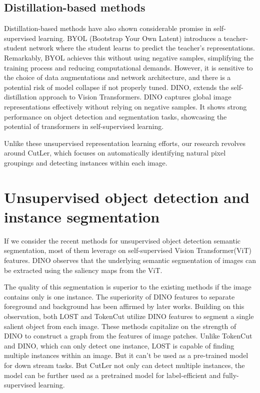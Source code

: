 \subsection{Distillation-based methods}
Distillation-based methods have also shown considerable promise in self-supervised learning. BYOL (Bootstrap Your Own Latent)\cite{grill2020bootstrap} introduces a teacher-student network where the student learns to predict the teacher's representations. Remarkably, BYOL achieves this without using negative samples, simplifying the training process and reducing computational demands. However, it is sensitive to the choice of data augmentations and network architecture, and there is a potential risk of model collapse if not properly tuned. DINO\cite{caron2021emerging}, extends the self-distillation approach to Vision Transformers\cite{dosovitskiy2020image}. DINO captures global image representations effectively without relying on negative samples. It shows strong performance on object detection and segmentation tasks, showcasing the potential of transformers in self-supervised learning.

Unlike these unsupervised representation learning efforts, our research revolves around CutLer\cite{wang2023cut}, which focuses on automatically identifying natural pixel groupings and detecting instances within each image.

\section{Unsupervised object detection and instance segmentation}
If we consider the recent methods for unsupervised object detection semantic segmentation, most of them leverage on self-supervised Vision Transformer(ViT)\cite{dosovitskiy2020image} features. DINO\cite{caron2021emerging} observes that the underlying semantic segmentation of images can be extracted using the saliency maps from the ViT. 

The quality of this segmentation is superior to the existing methods if the image contains only is one instance. The superiority of DINO features to separate foreground and background has been affirmed by later works\cite{engstler2023understanding}. Building on this observation, both LOST \cite{simeoni2021localizing} and TokenCut \cite{wang2022tokencut} utilize DINO features to segment a single salient object from each image. These methods capitalize on the strength of DINO to construct a graph from the features of image patches. Unlike TokenCut and DINO, which can only detect one instance, LOST is capable of finding multiple instances within an image. But it can't be used as a pre-trained model for down stream tasks. But CutLer\cite{wang2023cut} not only can detect multiple instances, the model can be further used as a pretrained model for label-efficient and fully-supervised learning.

